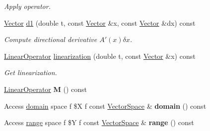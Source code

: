 \begin{DoxyCompactItemize}
\begin{DoxyCompactList}\small\item\em \-Apply operator. \end{DoxyCompactList}\item 
\hypertarget{classSpacy_1_1DynamicC1Operator_acac514b4a574321a0bf923f9b348e106}{\hyperlink{classSpacy_1_1Vector}{\-Vector} \hyperlink{classSpacy_1_1DynamicC1Operator_acac514b4a574321a0bf923f9b348e106}{d1} (double t, const \hyperlink{classSpacy_1_1Vector}{\-Vector} \&x, const \hyperlink{classSpacy_1_1Vector}{\-Vector} \&dx) const }\label{classSpacy_1_1DynamicC1Operator_acac514b4a574321a0bf923f9b348e106}

\begin{DoxyCompactList}\small\item\em \-Compute directional derivative $A'(x)\delta x$. \end{DoxyCompactList}\item 
\hypertarget{classSpacy_1_1DynamicC1Operator_a3beba5b0012422e11b9c989efe0e224b}{\hyperlink{classSpacy_1_1LinearOperator}{\-Linear\-Operator} \hyperlink{classSpacy_1_1DynamicC1Operator_a3beba5b0012422e11b9c989efe0e224b}{linearization} (double t, const \hyperlink{classSpacy_1_1Vector}{\-Vector} \&x) const }\label{classSpacy_1_1DynamicC1Operator_a3beba5b0012422e11b9c989efe0e224b}

\begin{DoxyCompactList}\small\item\em \-Get linearization. \end{DoxyCompactList}\item 
\hypertarget{classSpacy_1_1DynamicC1Operator_a8bef5bf8f2a8dd4e16ba39da1bda78d3}{\hyperlink{classSpacy_1_1LinearOperator}{\-Linear\-Operator} {\bfseries \-M} () const }\label{classSpacy_1_1DynamicC1Operator_a8bef5bf8f2a8dd4e16ba39da1bda78d3}

\item 
\hypertarget{classSpacy_1_1DynamicC1Operator_af2c63b9053e4f74acf0be073cdd59034}{\-Access \hyperlink{classSpacy_1_1DynamicC1Operator_ac8633283f219699d6a696e866f98fed6}{domain} space f \$\-X f \*
const \hyperlink{classSpacy_1_1VectorSpace}{\-Vector\-Space} \& {\bfseries domain} () const }\label{classSpacy_1_1DynamicC1Operator_af2c63b9053e4f74acf0be073cdd59034}

\item 
\hypertarget{classSpacy_1_1DynamicC1Operator_adce157e1ed77bc3cfae969829316102b}{\-Access \hyperlink{classSpacy_1_1DynamicC1Operator_a15daaabb27566457a0a3df02a13f9d96}{range} space f \$\-Y f \*
const \hyperlink{classSpacy_1_1VectorSpace}{\-Vector\-Space} \& {\bfseries range} () const }\label{classSpacy_1_1DynamicC1Operator_adce157e1ed77bc3cfae969829316102b}


\end{DoxyCompactItemize}
